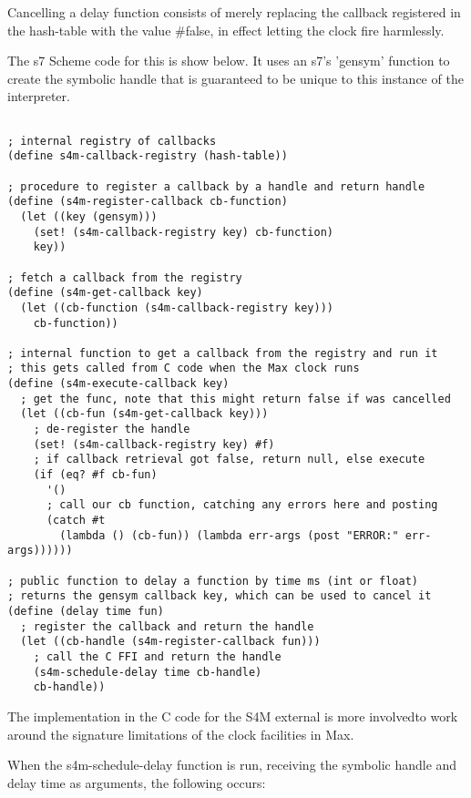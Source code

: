 \documentclass[acmsmall]{acmart}
\begin{document}
Cancelling a delay function consists of merely replacing the callback registered
in the hash-table with the value \#false, in effect letting the clock fire harmlessly.

The s7 Scheme code for this is show below. It uses an s7's 'gensym' function to create the
symbolic handle that is guaranteed to be unique to this instance of the interpreter.

\begin{verbatim}

; internal registry of callbacks 
(define s4m-callback-registry (hash-table))

; procedure to register a callback by a handle and return handle
(define (s4m-register-callback cb-function)
  (let ((key (gensym)))
    (set! (s4m-callback-registry key) cb-function)
    key))

; fetch a callback from the registry 
(define (s4m-get-callback key)
  (let ((cb-function (s4m-callback-registry key)))
    cb-function))

; internal function to get a callback from the registry and run it
; this gets called from C code when the Max clock runs
(define (s4m-execute-callback key)
  ; get the func, note that this might return false if was cancelled
  (let ((cb-fun (s4m-get-callback key)))
    ; de-register the handle
    (set! (s4m-callback-registry key) #f)
    ; if callback retrieval got false, return null, else execute 
    (if (eq? #f cb-fun) 
      '()
      ; call our cb function, catching any errors here and posting
      (catch #t 
        (lambda () (cb-fun)) (lambda err-args (post "ERROR:" err-args))))))

; public function to delay a function by time ms (int or float)
; returns the gensym callback key, which can be used to cancel it
(define (delay time fun)
  ; register the callback and return the handle
  (let ((cb-handle (s4m-register-callback fun)))
    ; call the C FFI and return the handle
    (s4m-schedule-delay time cb-handle)
    cb-handle))

\end{verbatim}

The implementation in the C code for the S4M external is more involvedto
work around the signature limitations of the clock facilities in Max.

When the s4m-schedule-delay function is run, receiving the symbolic handle
and delay time as arguments, the following occurs:
\end{document}
